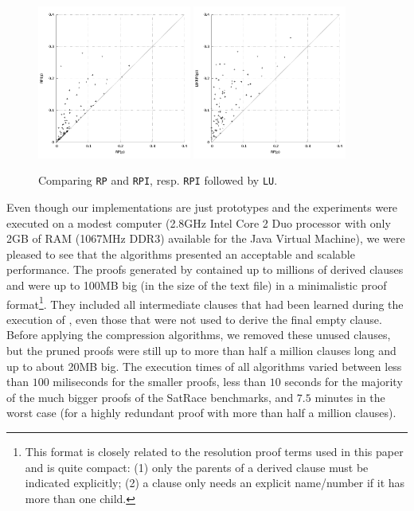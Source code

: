\documentclass[envcountsame]{llncs}
\newcommand{\RP}{\texttt{\upshape RP}}
\newcommand{\RPI}{\texttt{\upshape RPI}}
\newcommand{\LU}{\texttt{\upshape LU}}
\begin{document}
\begin{figure}[t]
  \centering
  \includegraphics[width=0.45\textwidth]{RPIvsRP.pdf}
  \includegraphics[width=0.45\textwidth]{LURPIvsRP.pdf}
  \caption{Comparing {\RP} and {\RPI}, resp. {\RPI} followed by {\LU}.}
  \label{Fig:RPI-versus-RP}
\end{figure}  

Even though our implementations are just prototypes and the experiments were executed on a modest computer 
(2.8GHz Intel Core 2 Duo processor with only 2GB of RAM (1067MHz DDR3) available for the Java Virtual Machine), 
we were pleased to see that the algorithms presented an acceptable and scalable performance. 
The proofs generated by {\verit} contained up to millions of derived clauses and were up to 100MB big (in the size of the text file) in a 
minimalistic proof format\footnote{This format is closely related to the resolution proof terms used in this 
paper and is quite compact: (1) only the parents of a derived clause must be indicated 
explicitly; %
(2) a clause only needs an explicit name/number if it has more than one child.}. 
They included all intermediate clauses that had been learned during the execution of {\verit}, 
even those that were not used to derive the final empty clause. Before applying the compression algorithms, 
we removed these unused clauses, but the pruned proofs were still up to more than half a million clauses long and 
up to about 20MB big. The execution times of all algorithms varied between less
than $100$ miliseconds for the smaller proofs, less than $10$ seconds for the
majority of the much bigger proofs of the SatRace benchmarks, and $7.5$ minutes
in the worst case (for a highly redundant proof with more than half a million
clauses).
%
\end{document}
